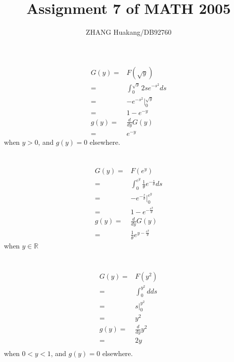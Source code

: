 \documentclass{article}
\title{Assignment 7 of MATH 2005}
\author{ZHANG Huakang/DB92760}
\begin{document}
    \maketitle

    \section{}
        \begin{equation*}
            \begin{split}
                G(y)=&F(\sqrt{y})\\
                    =&\int_0 ^{\sqrt{y}} 2se^{-s^2}ds\\
                    =&-e^{-s^2}|_0^{\sqrt{y}}\\
                    =&1-e^{-y}\\
                g(y)=&\frac{d}{dy}G(y)\\
                    =&e^{-y}
            \end{split}
        \end{equation*}
        when $y>0$, and $g(y)=0$ elsewhere.

    \section{}
        \begin{equation*}
            \begin{split}
                G(y)=&F(e^y)\\
                    =&\int _0 ^{e^y} \frac{1}{\theta}e^{-\frac{s}{\theta}}ds\\
                    =&-e^{-\frac{s}{\theta}}|_0^{e^y}\\
                    =&1-e^{-\frac{e^y}{\theta}}\\
                g(y)=&\frac{d}{dy}G(y)\\    
                    =&\frac{1}{\theta}e^{y-\frac{e^y}{\theta}}
            \end{split}
        \end{equation*}
        when $y\in \mathbb{R}$
    \section{}
        \begin{equation*}
            \begin{split}
                G(y)=&F(y^2)\\
                    =&\int _0 ^{y^2} d ds\\
                    =&s|_0^{y^2}\\
                    =&y^2\\
                g(y)=&\frac{d}{dy}y^2\\
                    =&2y\\
            \end{split}
        \end{equation*}
        when $0<y<1$, and $g(y)=0$ elsewhere.
\end{document}
